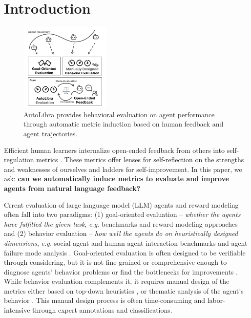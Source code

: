 \section{Introduction}

\begin{figure}
   \vspace{-44pt}
   \centering
   \includegraphics[width=0.4\textwidth]{figs/autolibra.pdf}
   \vspace{-10pt}
   \caption{AutoLibra provides behavioral evaluation on agent performance
    through automatic metric induction based on human feedback and agent trajectories.}
\end{figure}


Efficient human learners internalize open-ended feedback from others into self-regulation metrics
\citep{pintrich2002development,nicol2006formative}.
These metrics offer lenses for self-reflection on the
strengths and weaknesses of ourselves and ladders for self-improvement.
In this paper, we ask:
\textbf{can we automatically induce metrics to evaluate and improve agents from natural language feedback?} 

   
Crrent evaluation of large language model (LLM) agents and reward modeling often fall
into two paradigms: (1) goal-oriented evaluation --
\emph{whether the agents have fulfilled the given task},
\emph{e.g.} benchmarks \citep{zhouwebarena,jimenezswe,chan2024mle,paglieri2024balrog} and reward
modeling approaches \citep{pan2024autonomous,chen2025scaling,choudhury2025process}
and (2) behavior evaluation -- \emph{how well the agents do on heuristically designed dimensions},
\emph{e.g.} social agent and human-agent interaction benchmarks \citep{zhousotopia,shao2024collaborative}
and agent failure mode analysis \citep{pan2025why,zhang2023effects,yang2023behavioral}. 
Goal-oriented evaluation is often designed to be verifiable through considering, but it is not fine-grained
or comprehensive enough to diagnose agents' behavior problems or find the bottlenecks for improvements \citep{yehudai2025survey}.  
While behavior evaluation complements it, it requires manual design of the metrics either based on top-down heuristics
\citep{zhousotopia}, or thematic analysis of the agent's behavior \citep{shao2024collaborative,pan2025why}.
This manual design process is often time-consuming and labor-intensive through expert annotations and classifications. 

